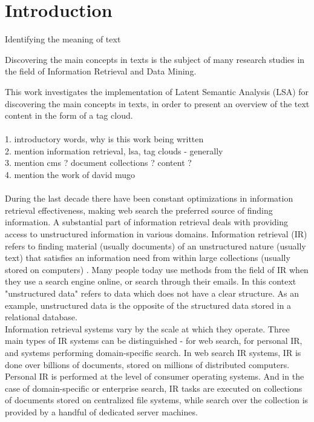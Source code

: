 \chapter{Introduction}
\label{sec:introduction}

Identifying the meaning of text

Discovering the main concepts in texts is the subject of many research studies in the field of Information Retrieval and Data Mining. 



This work investigates the implementation of Latent Semantic Analysis (LSA) for discovering the main concepts in texts, in order to present an overview of the text content in the form of a tag cloud.\\
\\
1. introductory words, why is this work being written \\
2. mention information retrieval, lsa, tag clouds - generally\\
3. mention cms ? document collections ? content ? \\
4. mention the work of david mugo \\
\\
During the last decade there have been constant optimizations in information retrieval effectiveness, making web search the preferred source of finding information. A substantial part of information retrieval deals with providing access to unstructured information in various domains. Information retrieval (IR) refers to finding material (usually documents) of an unstructured nature (usually text) that satisfies an information need from within large collections (usually stored on computers) \cite{Mann08}. Many people today use methods from the field of IR when they use a search engine online, or search through their emails. In this context "unstructured data" refers to data which does not have a clear structure. As an example, unstructured data is the opposite of the structured data stored in a relational database.    \\

Information retrieval systems vary by the scale at which they operate. Three main types of IR systems can be distinguished - for web search, for personal IR, and systems performing domain-specific search. In web search IR systems, IR is done over billions of documents, stored on millions of distributed computers. Personal IR is performed at the level of consumer operating systems. And in the case of domain-specific or enterprise search, IR tasks are executed on collections of documents stored on centralized file systems, while search over the collection is provided by a handful of dedicated server machines. \\

